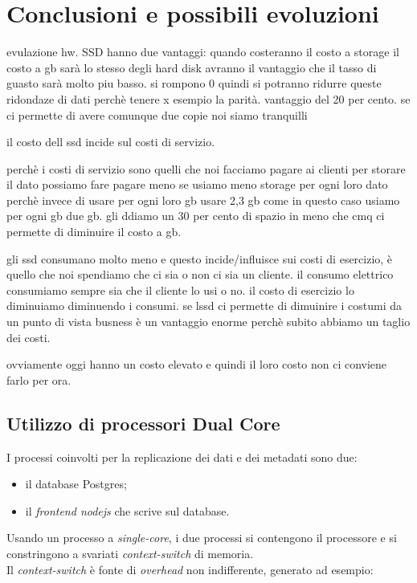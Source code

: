 \chapter{Conclusioni e possibili evoluzioni}


evulazione hw. 
SSD hanno due vantaggi:
quando costeranno il costo a storage il costo a gb sarà lo stesso degli hard disk avranno il vantaggio che il tasso di guasto sarà molto piu basso. si rompono 0 quindi si potranno ridurre queste ridondaze di dati perchè tenere x esempio la parità. vantaggio del 20 per cento. se ci permette di avere comunque due copie noi siamo tranquilli

il costo dell ssd incide sul costi di servizio.

 

perchè i costi di servizio sono quelli che noi facciamo pagare ai clienti per storare il dato possiamo fare pagare meno se usiamo meno storage per ogni loro dato perchè invece di usare per ogni loro gb usare 2,3 gb come in questo caso usiamo per ogni gb due gb. gli ddiamo un 30 per cento di spazio in meno che cmq ci permette di diminuire il costo a gb.


gli ssd consumano molto meno e questo incide/influisce sui costi di esercizio, è quello che noi spendiamo che ci sia o non ci sia un cliente. il consumo elettrico consumiamo sempre sia che il cliente lo usi o no. il costo di esercizio lo diminuiamo diminuendo i consumi. se lssd ci permette di dimuinire i costumi da un punto di vista busness è un vantaggio enorme perchè subito abbiamo un taglio dei costi.

ovviamente oggi hanno un costo elevato e quindi il loro costo non ci conviene farlo per ora.



\section{Utilizzo di processori Dual Core}
I processi coinvolti per la replicazione dei dati e dei metadati sono due: 
\begin{itemize}
\item 
il database Postgres;
\item
il \textit{frontend nodejs} che scrive sul database.\\
\end{itemize}

Usando un processo a \textit{single-core}, i due processi si contengono il processore e si constringono a svariati \textit{context-switch} di memoria.\\
Il \textit{context-switch} \`{e} fonte di \textit{overhead} non indifferente, generato ad esempio:

